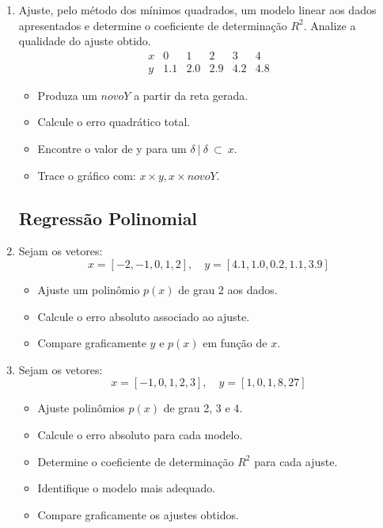 \begin{enumerate}[label=\thesection.\arabic*]
\item Ajuste, pelo método dos mínimos quadrados, um modelo linear aos dados apresentados e determine o coeficiente de determinação $R^2$. 
Analize a qualidade do ajuste obtido.
\[
\begin{array}{c|ccccc}
x & 0 & 1 & 2 & 3 & 4 \\
y & 1.1 & 2.0 & 2.9 & 4.2 & 4.8
\end{array}
\]
\begin{itemize}
    \item Produza um $novoY$ a partir da reta gerada.
    \item Calcule o erro quadrático total.
    \item Encontre o valor de y para um $ \delta\ | \ \delta\ \subset  \ x$.
    \item Trace o gráfico com: $ x \times y , x \times novoY$. 
\end{itemize}

\subsection*{Regressão Polinomial}

\item Sejam os vetores:
\[
x = [-2, -1, 0, 1, 2], \quad y = [4.1, 1.0, 0.2, 1.1, 3.9]
\]

\begin{itemize}
    \item Ajuste um polinômio $p(x)$ de grau 2 aos dados.
    \item Calcule o erro absoluto associado ao ajuste.
    \item Compare graficamente $y$ e $p(x)$ em função de $x$.
\end{itemize}

\item Sejam os vetores:
\[
x = [-1, 0, 1, 2, 3], \quad y = [1, 0, 1, 8, 27]
\]

\begin{itemize}
    \item Ajuste polinômios $p(x)$ de grau 2, 3 e 4.
    \item Calcule o erro absoluto para cada modelo.
    \item Determine o coeficiente de determinação $R^2$ para cada ajuste.
    \item Identifique o modelo mais adequado.
    \item Compare graficamente os ajustes obtidos.
\end{itemize}


\end{enumerate}
